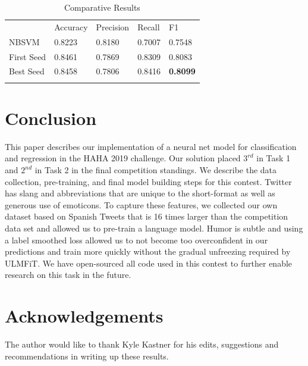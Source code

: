 \documentclass[runningheads]{llncs}
\begin{document}
\begin{table}[ht]
	\caption{Comparative Results}
	\label{tab:tab_results}
	\begin{tabular}{lllll}
		\hline\noalign{\smallskip}
		 & Accuracy & Precision & Recall & F1 \\
		\noalign{\smallskip}\hline\noalign{\smallskip}
NBSVM &      0.8223 & 0.8180 & 0.7007 & 0.7548 \\
First Seed & 0.8461 & 0.7869 & 0.8309 & 0.8083 \\
Best Seed &  0.8458 & 0.7806 & 0.8416 & \textbf{0.8099} \\
		\noalign{\smallskip}\hline
	\end{tabular}
\end{table}

\section{Conclusion}
\label{sec:5}
This paper describes our implementation of a neural net model for classification and regression in the HAHA 2019 challenge.  Our solution placed $3^{rd}$ in Task 1 and $2^{nd}$ in Task 2 in the final competition standings.  We describe the data collection, pre-training, and final model building steps for this contest.  Twitter has slang and abbreviations that are unique to the short-format as well as generous use of emoticons.  To capture these features, we collected our own dataset based on Spanish Tweets that is 16 times larger than the competition data set and allowed us to pre-train a language model.  Humor is subtle and using a label smoothed loss allowed us to not become too overconfident in our predictions and train more quickly without the gradual unfreezing required by ULMFiT. We have open-sourced all  code used in this contest to further enable research on this task in the future.

\section{Acknowledgements}
The author would like to thank Kyle Kastner for his edits, suggestions and recommendations in writing up these results. 


\end{document}
